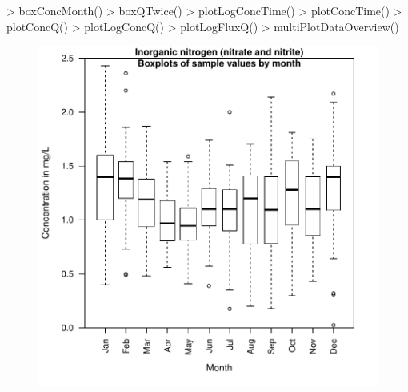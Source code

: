 \documentclass[a4paper,11pt]{article}
\begin{document}
\begin{Schunk}
\begin{Sinput}
> boxConcMonth()
> boxQTwice()
> plotLogConcTime()
> plotConcTime()
> plotConcQ()
> plotLogConcQ()
> plotLogFluxQ()
> multiPlotDataOverview()
\end{Sinput}
\end{Schunk}


\begin{figure}[htbp]
  \begin{minipage}[h]{0.5\linewidth}
    \begin{center}

\includegraphics{EGRET-figboxConcMonth}
    \label{fig:boxConcMonth}
    \end{center}
  \end{minipage}
  \hspace{0.5cm}
  \begin{minipage}[h]{0.5\linewidth}
    \begin{center}



\end{center}
\end{minipage}
\end{figure}
\end{document}
